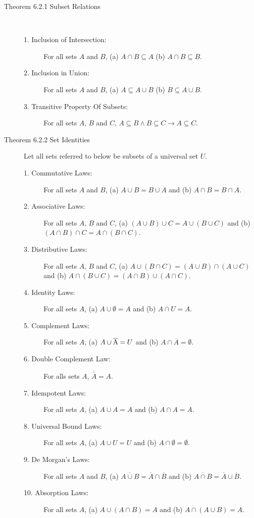 \documentclass{article}
\begin{document}
\begin{description}
    \item[Theorem 6.2.1 Subset Relations] \
    \begin{description}
    	\item[1. Inclusion of Intersection:] For all sets $A$ and $B$, (a) $A\cap B\subseteq A$ \qquad (b) $A\cap B \subseteq B$.
		\item[2. Inclusion in Union:] For all sets $A$ and $B$, (a) $A\subseteq A\cup B$ \qquad (b) $B\subseteq A\cup B$.
		\item[3. Transitive Property Of Subsets:] For all sets $A$, $B$ and $C$, $A\subseteq B\land B\subseteq C\to A\subseteq C$.
    \end{description}
	\item[Theorem 6.2.2 Set Identities] Let all sets referred to below be subsets of a universal set $U$. 
	\begin{description}
		\item[1. Commutative Laws:]For all sets $A$ and $B$, (a) $A \cup B = B\cup A$ \qquad and \qquad (b) $A \cap B=B\cap A$. 
		\item[2. Associative Laws:]For all sets $A$, $B$ and $C$, (a) $(A\cup B)\cup C=A\cup(B\cup C)$ \qquad and \qquad (b) $(A\cap B)\cap C=A\cap(B\cap C)$.
		\item[3. Distributive Laws:] For all sets $A$, $B$ and $C$, (a) $A\cup (B\cap C)=(A\cup B) \cap (A\cup C)$ \qquad and \qquad (b) $A\cap (B\cup C)=(A\cap B)\cup (A\cap C)$.
		\item[4. Identity Laws:]For all sets $A$, (a) $A\cup\emptyset = A$ \qquad and \qquad (b) $A\cap U=A$.
		\item[5. Complement Laws:]For all sets $A$, (a) $A\cup \overline{\rm A}=U$ \qquad and \qquad (b) $A\cap \overline{A} = \emptyset$.
		\item[6. Double Complement Law:]For alls sets $A$, $\overline{\overline{A}} = A$.
		\item[7. Idempotent Laws:] For all sets $A$, (a) $A\cup A = A$ \qquad and \qquad (b) $A\cap A = A$.
		\item[8. Universal Bound Laws:] For all sets $A$, (a) $A\cup U=U$ \qquad and \qquad (b) $A\cap \emptyset = \emptyset$.
		\item[9. De Morgan's Laws:] For all sets $A$ and $B$, (a) $\overline{A\cup B} = \overline{A} \cap \overline{B}$ \qquad and \qquad (b) $\overline{A\cap B} = \overline{A} \cup \overline{B}$.
		\item[10. Absorption Laws:] For all sets $A$, (a) $A\cup (A\cap B)=A$ \qquad and \qquad (b) $A\cap(A\cup B)=A$.

\end{description}
\end{description}
\end{document}

